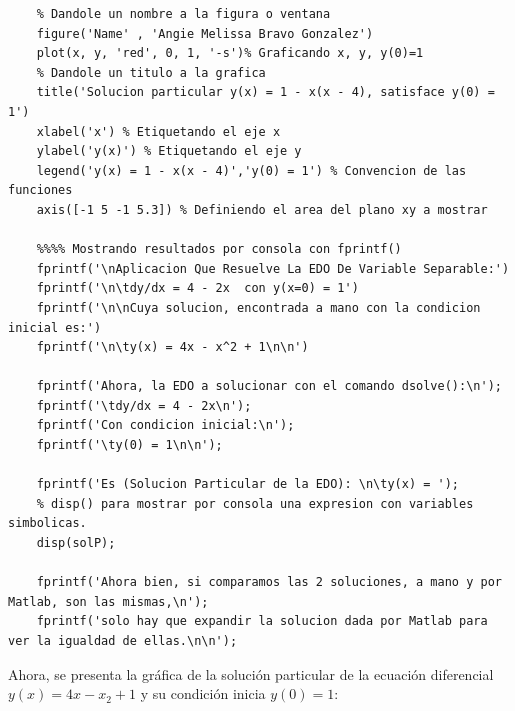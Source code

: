 \documentclass[12pt,a4paper,oneside]{book}
\begin{document}
\begin{itemize}
\begin{lstlisting}[frame=single]
	%%%% Graficando la solucion particular y condicion inicial
	% Dandole un nombre a la figura o ventana
	figure('Name' , 'Angie Melissa Bravo Gonzalez') 
	plot(x, y, 'red', 0, 1, '-s')% Graficando x, y, y(0)=1
	% Dandole un titulo a la grafica
	title('Solucion particular y(x) = 1 - x(x - 4), satisface y(0) = 1')
	xlabel('x') % Etiquetando el eje x
	ylabel('y(x)') % Etiquetando el eje y
	legend('y(x) = 1 - x(x - 4)','y(0) = 1') % Convencion de las funciones
	axis([-1 5 -1 5.3]) % Definiendo el area del plano xy a mostrar
	
	%%%% Mostrando resultados por consola con fprintf()
	fprintf('\nAplicacion Que Resuelve La EDO De Variable Separable:')
	fprintf('\n\tdy/dx = 4 - 2x  con y(x=0) = 1')
	fprintf('\n\nCuya solucion, encontrada a mano con la condicion inicial es:')
	fprintf('\n\ty(x) = 4x - x^2 + 1\n\n')
	
	fprintf('Ahora, la EDO a solucionar con el comando dsolve():\n');
	fprintf('\tdy/dx = 4 - 2x\n');
	fprintf('Con condicion inicial:\n');
	fprintf('\ty(0) = 1\n\n');
	
	fprintf('Es (Solucion Particular de la EDO): \n\ty(x) = ');
	% disp() para mostrar por consola una expresion con variables simbolicas.
	disp(solP); 
	
	fprintf('Ahora bien, si comparamos las 2 soluciones, a mano y por Matlab, son las mismas,\n');
	fprintf('solo hay que expandir la solucion dada por Matlab para ver la igualdad de ellas.\n\n');
	\end{lstlisting}
       \newpage
       Ahora, se presenta la gráfica de la solución particular de la ecuación diferencial $y(x)=4x-x_{2}+1$ y su condición inicia $y(0)=1$:\\
       
       
    \end{itemize}
    
\end{document}
